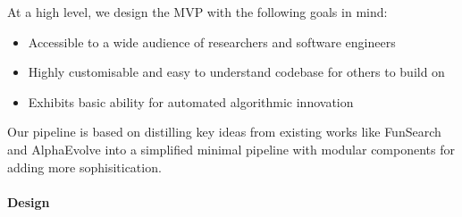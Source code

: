 \documentclass[12pt, legalpaper]{article}
\begin{document}
At a high level, we design the MVP with the following goals in mind: 
%
\begin{itemize}
    \item Accessible to a wide audience of researchers and software engineers

    \item Highly customisable and easy to understand codebase for others to build on

    \item Exhibits basic ability for automated algorithmic innovation
\end{itemize}
%
Our pipeline is based on distilling key ideas from existing works like FunSearch \citep{romera2024mathematical} and AlphaEvolve \citep{novikov2025alphaevolve} into a simplified minimal pipeline with modular components for adding more sophisitication. 




\paragraph{Design}
\end{document}
